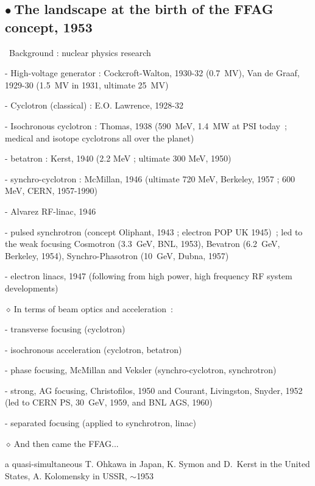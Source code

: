 \documentclass[12pt]{article}
\newcommand{\nib}{\noindent \ensuremath{\bullet~}}
\newcommand{\nid}{\noindent \ensuremath{\diamond~}}
\newcommand{\nin}{\noindent~}
\newcommand{\blue}{\color{blue}}
\begin{document}
\clearpage


{\fontsize{17}{20} \selectfont

\subsection*{\Huge \nib The landscape at the birth of the FFAG concept, 1953}

\nin Background : nuclear physics research

- High-voltage generator : Cockcroft-Walton, 1930-32 (0.7~MV),  Van de Graaf, 1929-30 (1.5~MV in 1931, ultimate 25~MV)

- Cyclotron (classical) :  E.O. Lawrence, 1928-32 

- Isochronous cyclotron :  Thomas, 1938 (590~MeV, 1.4~MW at PSI today~; medical and isotope cyclotrons all over the planet) 

- betatron : Kerst, 1940 (2.2 MeV ; ultimate 300 MeV, 1950)

- synchro-cyclotron : McMillan, 1946 (ultimate 720 MeV, Berkeley, 1957 ; 600 MeV, CERN, 1957-1990) 

- Alvarez RF-linac, 1946

- pulsed synchrotron (concept Oliphant, 1943 ; electron POP UK 1945)~;  led to the weak focusing Cosmotron (3.3~GeV, BNL, 1953), Bevatron (6.2~GeV, Berkeley, 1954), Synchro-Phasotron (10~GeV, Dubna, 1957)

-  electron linacs,  1947 (following from high power, high frequency RF system developments)


\medskip


{\blue
\nid In terms of beam optics and acceleration~:
}

- transverse focusing (cyclotron)

- isochronous acceleration (cyclotron, betatron)

- phase focusing, McMillan and Veksler (synchro-cyclotron, synchrotron)

- strong, AG focusing, Christofilos, 1950 and Courant, Livingston, Snyder, 1952 (led to CERN PS, 30~GeV, 1959, and BNL AGS, 1960)

- separated  focusing (applied to synchrotron, linac)


\medskip


{\blue
\nid And then came the FFAG...
}

a quasi-simultaneous T. Ohkawa in Japan, K. Symon and D.~Kerst in the United States, A. Kolomensky in USSR,  $\sim$1953 




} %
\end{document}
